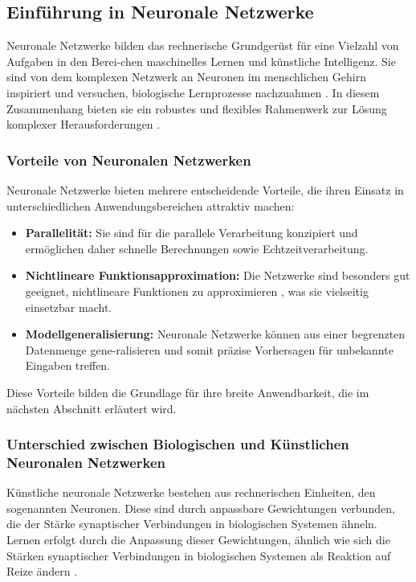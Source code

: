 \subsection{Einführung in Neuronale Netzwerke}
Neuronale Netzwerke bilden das rechnerische Grundgerüst für eine Vielzahl von Aufgaben in den Berei-chen maschinelles Lernen und künstliche Intelligenz. Sie sind von dem komplexen Netzwerk an Neuronen im menschlichen Gehirn inspiriert und versuchen, biologische Lernprozesse nachzuahmen \cite{aggarwal_neural_networks_2018}. In diesem Zusammenhang bieten sie ein robustes und flexibles Rahmenwerk zur Lösung komplexer Herausforderungen \cite{Goodfellow-et-al-2016}.

\subsubsection{Vorteile von Neuronalen Netzwerken}
Neuronale Netzwerke bieten mehrere entscheidende Vorteile, die ihren Einsatz in unterschiedlichen Anwendungsbereichen attraktiv machen:
\begin{itemize}
    \item \textbf{Parallelität:} Sie sind für die parallele Verarbeitung konzipiert und ermöglichen daher schnelle Berechnungen sowie Echtzeitverarbeitung.
    \item \textbf{Nichtlineare Funktionsapproximation:} Die Netzwerke sind besonders gut geeignet, nichtlineare Funktionen zu approximieren \cite{Goodfellow-et-al-2016}, was sie vielseitig einsetzbar macht.
    \item \textbf{Modellgeneralisierung:} Neuronale Netzwerke können aus einer begrenzten Datenmenge gene-ralisieren und somit präzise Vorhersagen für unbekannte Eingaben treffen.
\end{itemize}
Diese Vorteile bilden die Grundlage für ihre breite Anwendbarkeit, die im nächsten Abschnitt erläutert wird.

\subsubsection{Unterschied zwischen Biologischen und Künstlichen Neuronalen Netzwerken}
Künstliche neuronale Netzwerke bestehen aus rechnerischen Einheiten, den sogenannten Neuronen. Diese sind durch anpassbare Gewichtungen verbunden, die der Stärke synaptischer Verbindungen in biologischen Systemen ähneln. Lernen erfolgt durch die Anpassung dieser Gewichtungen, ähnlich wie sich die Stärken synaptischer Verbindungen in biologischen Systemen als Reaktion auf Reize ändern \cite{aggarwal_neural_networks_2018}.

